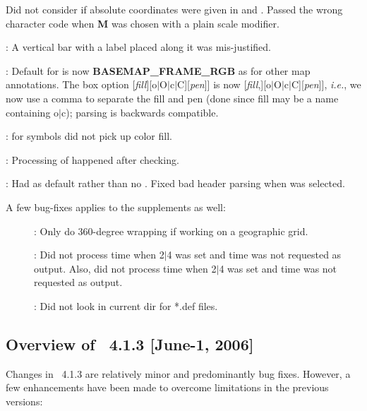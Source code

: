 \begin{description}
Did not consider if absolute coordinates were given in  and . Passed the wrong character code
when \textbf{M} was chosen with a plain scale modifier.
\item [\GMTprog{psscale}]: A vertical bar with a label placed along it was mis-justified.
\item [\GMTprog{pstext}]: Default for  is now \textbf{BASEMAP\_FRAME\_RGB} as for other map annotations.
The box option [\emph{fill}][o$|$O$|$c$|$C][\emph{pen}]] is now [\emph{fill},][o$|$O$|$c$|$C][\emph{pen}]], \emph{i.e.}, we now use
a comma to separate the fill and pen (done since fill may be a name containing o$|$c); parsing is backwards compatible.
\item [\GMTprog{psxyz}]:  for symbols did not pick up color fill.
\item [\GMTprog{trend2d}]: Processing of  happened after checking.
\item [\GMTprog{xyz2grd}]: Had  as default rather than no .  Fixed bad header parsing when  was selected.
\end{description}
A few bug-fixes applies to the supplements as well:
\begin{description}
\item []: Only do 360-degree wrapping if working on a geographic grid.
\item []: Did not process time when 2$|$4 was set and time was not requested as output.
Also, did not process time when 2$|$4 was set and time was not requested as output.
\item []: Did not look in current dir for *.def files.
\end{description}

\subsection{Overview of \gmt\ 4.1.3 [June-1, 2006]}

Changes in \GMT\ 4.1.3 are relatively minor and predominantly bug fixes.  However, a few enhancements
have been made to overcome limitations in the previous versions:

